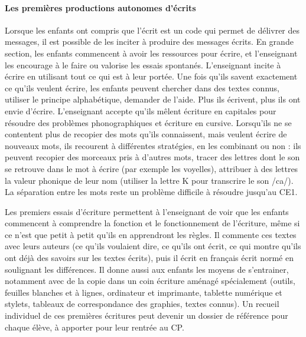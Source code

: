 \paragraph{Les premières productions autonomes d’écrits}
Lorsque les enfants ont compris que l’écrit est un code qui permet de délivrer des messages, il est possible de les inciter à produire des messages écrits. En grande section, les enfants commencent à avoir les ressources pour écrire, et l’enseignant les encourage à le faire ou valorise les essais spontanés. L’enseignant incite à écrire en utilisant tout ce qui est à leur portée. Une fois qu’ils savent exactement ce qu’ils veulent écrire, les enfants peuvent chercher dans des textes connus, utiliser le principe alphabétique, demander de l’aide. Plus ils écrivent, plus ils ont envie d’écrire. L’enseignant accepte qu’ils mêlent écriture en capitales pour résoudre des problèmes phonographiques et écriture en cursive. Lorsqu’ils ne se contentent plus de recopier des mots qu’ils connaissent, mais veulent écrire de nouveaux mots, ils recourent à différentes stratégies, en les combinant ou non : ils peuvent recopier des morceaux pris à d’autres mots, tracer des lettres dont le son se retrouve dans le mot à écrire (par exemple les voyelles), attribuer à des lettres la valeur phonique de leur nom (utiliser la lettre K pour transcrire le son /ca/). La séparation entre les mots reste un problème difficile à résoudre jusqu’au CE1. 

Les premiers essais d’écriture permettent à l’enseignant de voir que les enfants commencent à comprendre la fonction et le fonctionnement de l’écriture, même si ce n’est que petit à petit qu’ils en apprendront les règles. Il commente ces textes avec leurs auteurs (ce qu’ils voulaient dire, ce qu’ils ont écrit, ce qui montre qu’ils ont déjà des savoirs sur les textes écrits), puis il écrit en français écrit normé en soulignant les différences. Il donne aussi aux enfants les moyens de s’entrainer, notamment avec de la copie dans un coin écriture aménagé spécialement (outils, feuilles blanches et à lignes, ordinateur et imprimante, tablette numérique et stylets, tableaux de correspondance des graphies, textes connus). Un recueil individuel de ces premières écritures peut devenir un dossier de référence pour chaque élève, à apporter pour leur rentrée au CP.

